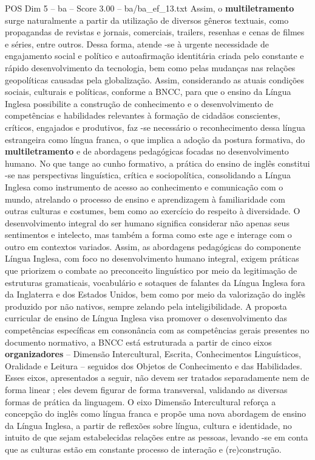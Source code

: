\begin{textsample}{POS Dim 5 – ba – Score 3.00 – ba/ba\_ef\_13.txt}
Assim, o \textbf{multiletramento} surge naturalmente a partir da utilização de diversos gêneros textuais, como propagandas de revistas e jornais, comerciais, trailers, resenhas e cenas de filmes e séries, entre outros.
Dessa forma, atende -se à urgente necessidade de engajamento social e político e autoafirmação identitária criada pelo constante e rápido desenvolvimento da tecnologia, bem como pelas mudanças nas relações geopolíticas causadas pela globalização.
Assim, considerando as atuais condições sociais, culturais e políticas, conforme a BNCC, para que o ensino da Língua Inglesa possibilite a construção de conhecimento e o desenvolvimento de competências e habilidades relevantes à formação de cidadãos conscientes, críticos, engajados e produtivos, faz -se necessário o reconhecimento dessa língua estrangeira como língua franca, o que implica a adoção da postura formativa, do \textbf{multiletramento} e de abordagens pedagógicas focadas no desenvolvimento humano.
No que tange ao cunho formativo, a prática do ensino de inglês constitui -se nas perspectivas linguística, crítica e sociopolítica, consolidando a Língua Inglesa como instrumento de acesso ao conhecimento e comunicação com o mundo, atrelando o processo de ensino e aprendizagem à familiaridade com outras culturas e costumes, bem como ao exercício do respeito à diversidade.
O desenvolvimento integral do ser humano significa considerar não apenas seus sentimentos e intelecto, mas também a forma como este age e interage com o outro em contextos variados.
Assim, as abordagens pedagógicas do componente Língua Inglesa, com foco no desenvolvimento humano integral, exigem práticas que priorizem o combate ao preconceito linguístico por meio da legitimação de estruturas gramaticais, vocabulário e sotaques de falantes da Língua Inglesa fora da Inglaterra e dos Estados Unidos, bem como por meio da valorização do inglês produzido por não nativos, sempre zelando pela inteligibilidade.
A proposta curricular de ensino de Língua Inglesa visa promover o desenvolvimento das competências específicas em consonância com as competências gerais presentes no documento normativo, a BNCC está estruturada a partir de cinco eixos \textbf{organizadores} – Dimensão Intercultural, Escrita, Conhecimentos Linguísticos, Oralidade e Leitura – seguidos dos Objetos de Conhecimento e das Habilidades.
Esses eixos, apresentados a seguir, não devem ser tratados separadamente nem de forma linear ; eles devem figurar de forma transversal, validando as diversas formas de prática da linguagem.
O eixo Dimensão Intercultural reforça a concepção do inglês como língua franca e propõe uma nova abordagem de ensino da Língua Inglesa, a partir de reflexões sobre língua, cultura e identidade, no intuito de que sejam estabelecidas relações entre as pessoas, levando -se em conta que as culturas estão em constante processo de interação e (re)construção.

\end{textsample}
